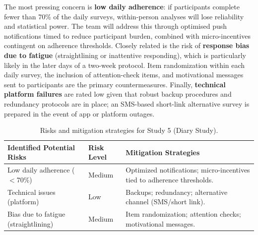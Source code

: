 The most pressing concern is \textbf{low daily adherence}: if participants complete fewer than 70\% of the daily surveys, within-person analyses will lose reliability and statistical power. The team will address this through optimised push notifications timed to reduce participant burden, combined with micro-incentives contingent on adherence thresholds. Closely related is the risk of \textbf{response bias due to fatigue} (straightlining or inattentive responding), which is particularly likely in the later days of a two-week protocol. Item randomization within each daily survey, the inclusion of attention-check items, and motivational messages sent to participants are the primary countermeasures. Finally, \textbf{technical platform failures} are rated low given that robust backup procedures and redundancy protocols are in place; an SMS-based short-link alternative survey is prepared in the event of app or platform outages.

\vspace{0.5cm}

\begin{table}[h!]
\centering
\caption{Risks and mitigation strategies for Study 5 (Diary Study).}
\begin{tabular}{|P{5.2cm}|P{2.0cm}|P{7.1cm}|}
\hline
{}
\textbf{Identified Potential Risks} & \textbf{Risk Level} & \textbf{Mitigation Strategies} \\
\hline
Low daily adherence ($<$70\%)
  & Medium
  & Optimized notifications; micro-incentives tied to adherence thresholds. \\
\hline
Technical issues (platform)
  & Low
  & Backups; redundancy; alternative channel (SMS/short link). \\
\hline
Bias due to fatigue (straightlining)
  & Medium
  & Item randomization; attention checks; motivational messages. \\
\hline
\end{tabular}
\end{table}

